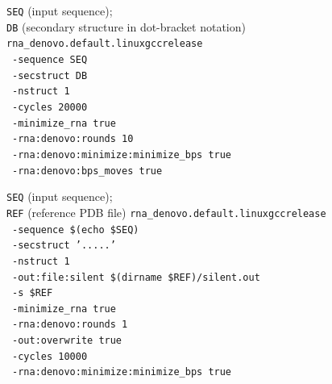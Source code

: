 \documentclass[%
aip,
 amsmath,amssymb,
reprint,%
twocolumn,
]{revtex4-1}
\begin{document}
{\begin{algorithm}[H]
  \caption{Conformational sampling with FARFAR2}
  \label{alg:rna_denovo}
  \begin{algorithmic}[1]
  \REQUIRE \texttt{SEQ} (input sequence);\\
  \texttt{DB} (secondary structure in dot-bracket notation)
    \STATE \texttt{rna\_denovo.default.linuxgccrelease} \\
    \ \texttt{-sequence SEQ}  \\
    \ \texttt{-secstruct DB} \\
    \ \texttt{-nstruct 1} \\
    \ \texttt{-cycles 20000} \\
    \ \texttt{-minimize\_rna true} \\
    \ \texttt{-rna:denovo:rounds 10} \\
    \ \texttt{-rna:denovo:minimize:minimize\_bps true} \\
    \ \texttt{-rna:denovo:bps\_moves true}
  \end{algorithmic}
\end{algorithm}

\begin{algorithm}[H]
  \caption{Reference conformation preparation with FARFAR2}
  \label{alg:farfar-minimise}
  \begin{algorithmic}[1]
    \REQUIRE \texttt{SEQ} (input sequence);\\
    \texttt{REF} (reference PDB file)
    \STATE \texttt{rna\_denovo.default.linuxgccrelease} \\
    \ \texttt{-sequence \$(echo \$SEQ)}  \\[-0.2em]
    \ \texttt{-secstruct '.....'}  \\[-0.2em]
    \ \texttt{-nstruct 1} \\[-0.2em]
    \ \texttt{-out:file:silent \$(dirname \$REF)/silent.out} \\[-0.2em]
    \ \texttt{-s \$REF}  \\[-0.2em]
    \ \texttt{-minimize\_rna true} \\[-0.2em]
    \ \texttt{-rna:denovo:rounds 1} \\[-0.2em]
    \ \texttt{-out:overwrite true} \\[-0.2em]
    \ \texttt{-cycles 10000} \\[-0.2em]
    \ \texttt{-rna:denovo:minimize:minimize\_bps true}
  \end{algorithmic}
\end{algorithm}

}
\end{document}
